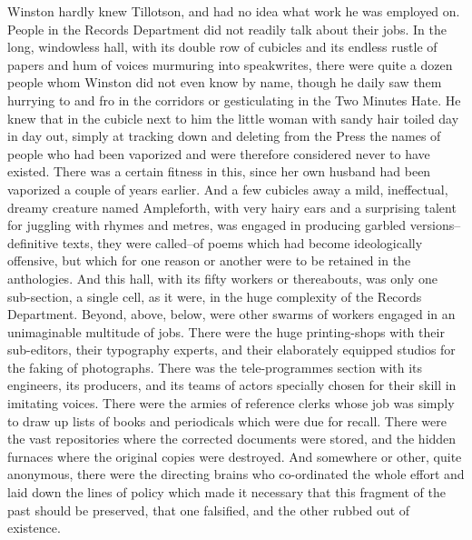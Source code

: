 \documentclass{article}
\begin{document}
Winston hardly knew Tillotson, and had no idea what work he was employed
on. People in the Records Department did not readily talk about their jobs.
In the long, windowless hall, with its double row of cubicles and its
endless rustle of papers and hum of voices murmuring into speakwrites,
there were quite a dozen people whom Winston did not even know by name,
though he daily saw them hurrying to and fro in the corridors or
gesticulating in the Two Minutes Hate. He knew that in the cubicle next
to him the little woman with sandy hair toiled day in day out, simply at
tracking down and deleting from the Press the names of people who had been
vaporized and were therefore considered never to have existed. There was a
certain fitness in this, since her own husband had been vaporized a couple
of years earlier. And a few cubicles away a mild, ineffectual, dreamy
creature named Ampleforth, with very hairy ears and a surprising talent
for juggling with rhymes and metres, was engaged in producing garbled
versions--definitive texts, they were called--of poems which had become
ideologically offensive, but which for one reason or another were to be
retained in the anthologies. And this hall, with its fifty workers or
thereabouts, was only one sub-section, a single cell, as it were, in the
huge complexity of the Records Department. Beyond, above, below, were other
swarms of workers engaged in an unimaginable multitude of jobs. There were
the huge printing-shops with their sub-editors, their typography experts,
and their elaborately equipped studios for the faking of photographs. There
was the tele-programmes section with its engineers, its producers, and its
teams of actors specially chosen for their skill in imitating voices. There
were the armies of reference clerks whose job was simply to draw up lists
of books and periodicals which were due for recall. There were the vast
repositories where the corrected documents were stored, and the hidden
furnaces where the original copies were destroyed. And somewhere or other,
quite anonymous, there were the directing brains who co-ordinated the whole
effort and laid down the lines of policy which made it necessary that this
fragment of the past should be preserved, that one falsified, and the other
rubbed out of existence.
\end{document}
